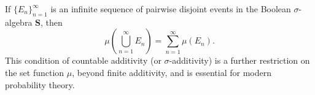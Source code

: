 If $\{E_n\}_{n=1}^{\infty}$ is an infinite sequence of pairwise disjoint events in the Boolean $\sigma$-algebra $\mathbf{S}$, then
$$\mu\left(\bigcup_{n=1}^{\infty} E_n\right) = \sum_{n=1}^{\infty} \mu(E_n).$$
This condition of countable additivity (or $\sigma$-additivity) is a further restriction on the set function $\mu$, beyond finite additivity, and is essential for modern probability theory.
